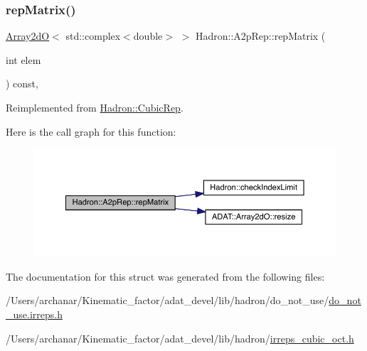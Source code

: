 \subsubsection{\texorpdfstring{repMatrix()}{repMatrix()}\hspace{0.1cm}{\footnotesize\ttfamily [2/2]}}
{\footnotesize\ttfamily \mbox{\hyperlink{classADAT_1_1Array2dO}{Array2dO}}$<$ std\+::complex$<$double$>$ $>$ Hadron\+::\+A2p\+Rep\+::rep\+Matrix (\begin{DoxyParamCaption}\item[{int}]{elem }\end{DoxyParamCaption}) const\hspace{0.3cm}{\ttfamily [inline]}, {\ttfamily [virtual]}}



Reimplemented from \mbox{\hyperlink{structHadron_1_1CubicRep_ac5d7e9e6f4ab1158b5fce3e4ad9e8005}{Hadron\+::\+Cubic\+Rep}}.

Here is the call graph for this function\+:
\nopagebreak
\begin{figure}[H]
\begin{center}
\leavevmode
\includegraphics[width=350pt]{d4/d33/structHadron_1_1A2pRep_aeede31465f59cff568c2ada0aa32ac37_cgraph}
\end{center}
\end{figure}


The documentation for this struct was generated from the following files\+:\begin{DoxyCompactItemize}
\item 
/\+Users/archanar/\+Kinematic\+\_\+factor/adat\+\_\+devel/lib/hadron/do\+\_\+not\+\_\+use/\mbox{\hyperlink{do__not__use_8irreps_8h}{do\+\_\+not\+\_\+use.\+irreps.\+h}}\item 
/\+Users/archanar/\+Kinematic\+\_\+factor/adat\+\_\+devel/lib/hadron/\mbox{\hyperlink{lib_2hadron_2irreps__cubic__oct_8h}{irreps\+\_\+cubic\+\_\+oct.\+h}}\end{DoxyCompactItemize}
